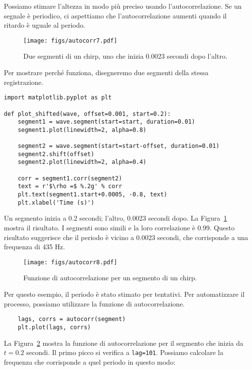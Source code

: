 \documentclass[12pt,a4paper]{book}
\begin{document}
Possiamo stimare l'altezza in modo più preciso usando l'autocorrelazione. Se un segnale è periodico, ci aspettiamo che l'autocorrelazione aumenti quando il ritardo è uguale al periodo.

\begin{figure} 

\centerline{\texttt{[image: figs/autocorr7.pdf]}} \caption{Due segmenti di un chirp, uno che inizia 0.0023 secondi dopo l'altro.} \label{fig.autocorr7} \end{figure} 

Per mostrare perché funziona, disegneremo due segmenti della stessa registrazione.

\begin{verbatim} 
import matplotlib.pyplot as plt

def plot_shifted(wave, offset=0.001, start=0.2):
    segment1 = wave.segment(start=start, duration=0.01)
    segment1.plot(linewidth=2, alpha=0.8)

    segment2 = wave.segment(start=start-offset, duration=0.01)
    segment2.shift(offset)
    segment2.plot(linewidth=2, alpha=0.4)

    corr = segment1.corr(segment2)
    text = r'$\rho =$ %.2g' % corr
    plt.text(segment1.start+0.0005, -0.8, text)
    plt.xlabel('Time (s)')
 \end{verbatim} 

Un segmento inizia a 0.2 secondi; l'altro, 0.0023 secondi dopo. La Figura~\ref{fig.autocorr7} mostra il risultato. I segmenti sono simili e la loro correlazione è 0.99. Questo risultato suggerisce che il periodo è vicino a 0.0023 secondi, che corrisponde a una frequenza di 435 Hz.

\begin{figure} 

\centerline{\texttt{[image: figs/autocorr8.pdf]}} \caption{Funzione di autocorrelazione per un segmento di un chirp.} \label{fig.autocorr8} \end{figure} 

Per questo esempio, il periodo è stato stimato per tentativi. Per automatizzare il processo, possiamo utilizzare la funzione di autocorrelazione.

\begin{verbatim} 
    lags, corrs = autocorr(segment)
    plt.plot(lags, corrs)
 \end{verbatim} 

La Figura~\ref{fig.autocorr8} mostra la funzione di autocorrelazione per il segmento che inizia da $t=0.2$ secondi. Il primo picco si verifica a {\tt lag=101}. Possiamo calcolare la frequenza che corrisponde a quel periodo in questo modo:
\end{document}
